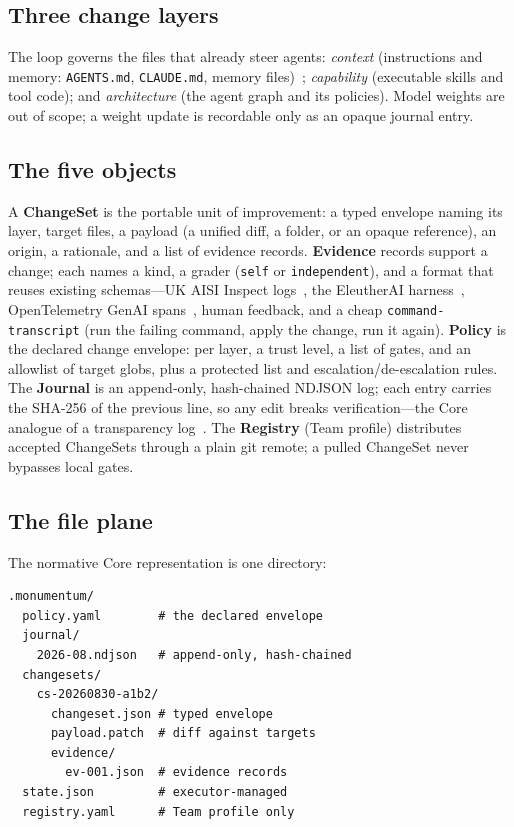 \documentclass[10pt,twocolumn]{article}
\begin{document}
\subsection{Three change layers}
The loop governs the files that already steer agents:
\emph{context} (instructions and memory: \texttt{AGENTS.md},
\texttt{CLAUDE.md}, memory files)~\cite{agentsmd}; \emph{capability}
(executable skills and tool code); and \emph{architecture} (the agent
graph and its policies). Model weights are out of scope; a weight update
is recordable only as an opaque journal entry.

\subsection{The five objects}
A \textbf{ChangeSet} is the portable unit of improvement: a typed envelope
naming its layer, target files, a payload (a unified diff, a folder, or an
opaque reference), an origin, a rationale, and a list of evidence records.
\textbf{Evidence} records support a change; each names a kind, a grader
(\texttt{self} or \texttt{independent}), and a format that reuses existing
schemas---UK AISI Inspect logs~\cite{inspect}, the EleutherAI
harness~\cite{lmeval}, OpenTelemetry GenAI spans~\cite{otelgenai}, human
feedback, and a cheap \texttt{command-transcript} (run the failing command,
apply the change, run it again). \textbf{Policy} is the declared change
envelope: per layer, a trust level, a list of gates, and an allowlist of
target globs, plus a protected list and escalation/de-escalation rules.
The \textbf{Journal} is an append-only, hash-chained NDJSON log; each entry
carries the SHA-256 of the previous line, so any edit breaks
verification---the Core analogue of a transparency log~\cite{rfc6962}. The
\textbf{Registry} (Team profile) distributes accepted ChangeSets through a
plain git remote; a pulled ChangeSet never bypasses local gates.

\subsection{The file plane}
The normative Core representation is one directory:

\begin{verbatim}
.monumentum/
  policy.yaml        # the declared envelope
  journal/
    2026-08.ndjson   # append-only, hash-chained
  changesets/
    cs-20260830-a1b2/
      changeset.json # typed envelope
      payload.patch  # diff against targets
      evidence/
        ev-001.json  # evidence records
  state.json         # executor-managed
  registry.yaml      # Team profile only
\end{verbatim}
\end{document}
